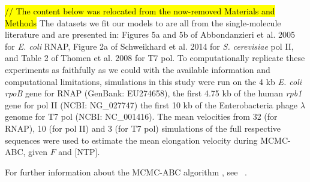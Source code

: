 \documentclass[10pt,letterpaper]{article}
\begin{document}
\textcolor{red}{\hl{// The content below was relocated from the now-removed Materials and Methods}}
The datasets we fit our models to are all from the single-molecule literature and are presented in: Figures 5a and 5b of Abbondanzieri et al. 2005 \cite{abbondanzieri2005direct} for \textit{ E. coli} RNAP, Figure 2a of Schweikhard et al. 2014 \cite{schweikhard2014transcription} for \textit{ S. cerevisiae} pol II, and Table 2 of Thomen et al. 2008 \cite{thomen2008t7} for T7 pol. To computationally replicate these experiments as faithfully as we could with the available information and computational limitations, simulations in this study were run on the 4 kb \textit{E. coli} \textit{rpoB} gene for RNAP (GenBank: EU274658), the first 4.75 kb of the human \textit{ rpb1} gene for pol II (NCBI: NG\_027747) the first 10 kb of the Enterobacteria phage $\lambda$ genome for T7 pol (NCBI: NC\_001416). The mean velocities from 32 (for RNAP), 10 (for pol II) and 3 (for T7 pol) simulations of the full respective sequences were used to estimate the mean elongation velocity during MCMC-ABC, given $F$ and [NTP].  \par

For further information about the MCMC-ABC algorithm \cite{beaumont2010approximate, csillery2010approximate}, see ~.
\end{document}
